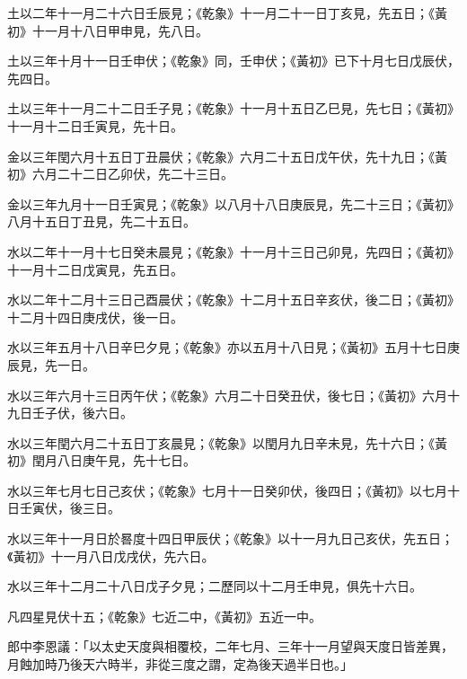 \begin{pinyinscope}
 土以二年十一月二十六日壬辰見；《乾象》十一月二十一日丁亥見，先五日；《黃初》十一月十八日甲申見，先八日。



 土以三年十月十一日壬申伏；《乾象》同，壬申伏；《黃初》已下十月七日戊辰伏，先四日。



 土以三年十一月二十二日壬子見；《乾象》十一月十五日乙巳見，先七日；《黃初》十一月十二日壬寅見，先十日。



 金以三年閏六月十五日丁丑晨伏；《乾象》六月二十五日戊午伏，先十九日；《黃初》六月二十二日乙卯伏，先二十三日。



 金以三年九月十一日壬寅見；《乾象》以八月十八日庚辰見，先二十三日；《黃初》八月十五日丁丑見，先二十五日。



 水以二年十一月十七日癸未晨見；《乾象》十一月十三日己卯見，先四日；《黃初》十一月十二日戊寅見，先五日。



 水以二年十二月十三日己酉晨伏；《乾象》十二月十五日辛亥伏，後二日；《黃初》十二月十四日庚戌伏，後一日。



 水以三年五月十八日辛巳夕見；《乾象》亦以五月十八日見；《黃初》五月十七日庚辰見，先一日。



 水以三年六月十三日丙午伏；《乾象》六月二十日癸丑伏，後七日；《黃初》六月十九日壬子伏，後六日。



 水以三年閏六月二十五日丁亥晨見；《乾象》以閏月九日辛未見，先十六日；《黃初》閏月八日庚午見，先十七日。



 水以三年七月七日己亥伏；《乾象》七月十一日癸卯伏，後四日；《黃初》以七月十日壬寅伏，後三日。



 水以三年十一月日於晷度十四日甲辰伏；《乾象》以十一月九日己亥伏，先五日；《黃初》十一月八日戊戌伏，先六日。



 水以三年十二月二十八日戊子夕見；二歷同以十二月壬申見，俱先十六日。



 凡四星見伏十五；《乾象》七近二中，《黃初》五近一中。



 郎中李恩議：「以太史天度與相覆校，二年七月、三年十一月望與天度日皆差異，月蝕加時乃後天六時半，非從三度之謂，定為後天過半日也。」




\end{pinyinscope}
